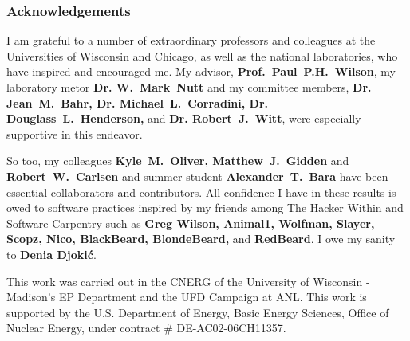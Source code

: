 \begin{frame}
\frametitle{Acknowledgements}
\indent I am grateful to a number of extraordinary professors and colleagues at the 
Universities of Wisconsin and Chicago, as well as the national laboratories, 
who have inspired and encouraged me. My advisor, 
\textbf{Prof.~Paul~P.H.~Wilson}, my laboratory metor \textbf{Dr. W.~Mark~Nutt} 
and my committee members, \textbf{Dr. Jean~M.~Bahr, Dr.  Michael~L.~Corradini, 
Dr. Douglass~L.~Henderson,} and \textbf{Dr. Robert~J.~Witt}, were especially 
supportive in this endeavor. 

\indent So too, my colleagues \textbf{Kyle~M.~Oliver, Matthew~J.~Gidden} and 
\textbf{Robert~W.~Carlsen} and summer student \textbf{Alexander~T.~Bara} have 
been essential collaborators and contributors.  All confidence I have in these 
results is owed to software practices inspired by my friends among The Hacker 
Within and Software Carpentry such as \textbf{Greg Wilson, Animal1, Wolfman, 
Slayer, Scopz, Nico,  BlackBeard, BlondeBeard,} and \textbf{RedBeard}. I owe my 
sanity to \textbf{Denia Djoki\'{c}}.

\indent This work was carried out in the CNERG of the University of Wisconsin -
Madison's EP Department and the UFD Campaign at ANL. This work is supported by
the U.S. Department of Energy, Basic Energy Sciences, Office of Nuclear Energy, 
under contract \# DE-AC02-06CH11357.
\end{frame}

